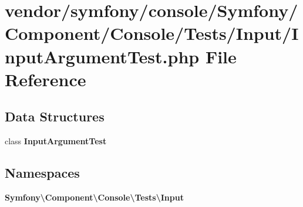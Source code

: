 \section{vendor/symfony/console/\+Symfony/\+Component/\+Console/\+Tests/\+Input/\+Input\+Argument\+Test.php File Reference}
\label{_input_argument_test_8php}
\subsection*{Data Structures}
\begin{DoxyCompactItemize}
\item 
class {\bf Input\+Argument\+Test}
\end{DoxyCompactItemize}
\subsection*{Namespaces}
\begin{DoxyCompactItemize}
\item 
 {\bf Symfony\textbackslash{}\+Component\textbackslash{}\+Console\textbackslash{}\+Tests\textbackslash{}\+Input}
\end{DoxyCompactItemize}
